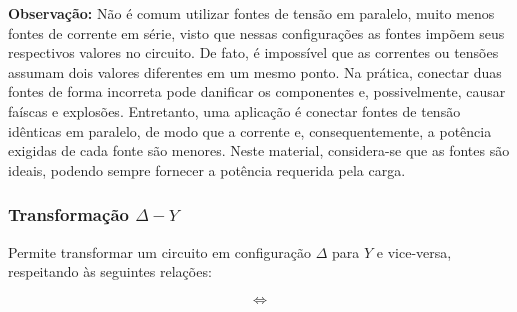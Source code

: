 \documentclass{article}
\numberwithin{equation}{section}
\newlength\Colsep
\begin{document}
\textbf{Observação:} Não é comum utilizar fontes de tensão em paralelo, muito menos fontes de corrente em série, visto que nessas configurações as fontes impõem seus respectivos valores no circuito. De fato, é impossível que as correntes ou tensões assumam dois valores diferentes em um mesmo ponto. Na prática, conectar duas fontes de forma incorreta pode danificar os componentes e, possivelmente, causar faíscas e explosões. Entretanto, uma aplicação é conectar fontes de tensão idênticas em paralelo, de modo que a corrente e, consequentemente, a potência exigidas de cada fonte são menores. Neste material, considera-se que as fontes são ideais, podendo sempre fornecer a potência requerida pela carga.

\subsubsection{Transformação $\Delta-Y$}
\label{subsubsec:deltay}
Permite transformar um circuito em configuração $\Delta$ para $Y$ e vice-versa, respeitando às seguintes relações:

\noindent\begin{minipage}{\textwidth}
\begin{minipage}[c][5cm][c]{\dimexpr0.45\textwidth-0.5\Colsep\relax}
    \begin{center}
    \end{center}
\end{minipage} \hfill
\begin{minipage}[c][5cm][c]{\dimexpr0.1\textwidth-0.5\Colsep\relax}
    $$\iff$$
\end{minipage} \hfill
\begin{minipage}[c][5cm][c]{\dimexpr0.45\textwidth-0.5\Colsep\relax}
    \begin{center}
    \end{center}
\end{minipage}
\end{minipage}
\end{document}

